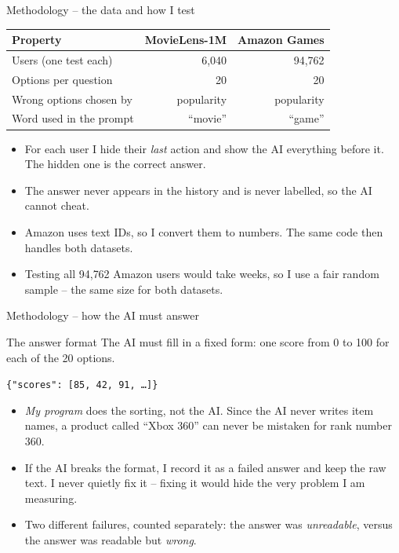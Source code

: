 \documentclass[aspectratio=169,12pt]{beamer}
\newcommand{\code}[1]{\texttt{\footnotesize #1}}
\begin{document}
\begin{frame}{Methodology -- the data and how I test}
\begin{table}
\centering
\small
\begin{tabular}{lrr}
\toprule
\textbf{Property} & \textbf{MovieLens-1M} & \textbf{Amazon Games}\\
\midrule
Users (one test each) & 6{,}040 & 94{,}762\\
Options per question & 20 & 20\\
Wrong options chosen by & popularity & popularity\\
Word used in the prompt & ``movie'' & ``game''\\
\bottomrule
\end{tabular}
\end{table}

\begin{itemize}
  \item For each user I hide their \emph{last} action and show the AI
        everything before it. The hidden one is the correct answer.
  \item The answer never appears in the history and is never labelled, so
        the AI cannot cheat.
  \item Amazon uses text IDs, so I convert them to numbers. The same code
        then handles both datasets.
  \item Testing all 94{,}762 Amazon users would take weeks, so I use a fair
        random sample -- the same size for both datasets.
\end{itemize}
\end{frame}

\begin{frame}{Methodology -- how the AI must answer}
\begin{block}{The answer format}
The AI must fill in a fixed form: one score from 0 to 100 for each of the
20 options.
\vspace{0.3em}
\centerline{\code{\{"scores": [85, 42, 91, \ldots]\}}}
\end{block}

\vspace{0.5em}
\begin{itemize}
  \item \emph{My program} does the sorting, not the AI. Since the AI never
        writes item names, a product called ``Xbox 360'' can never be
        mistaken for rank number 360.
  \item If the AI breaks the format, I record it as a failed answer and
        keep the raw text. I never quietly fix it -- fixing it would hide
        the very problem I am measuring.
  \item Two different failures, counted separately: the answer was
        \emph{unreadable}, versus the answer was readable but \emph{wrong}.
\end{itemize}
\end{frame}
\end{document}
